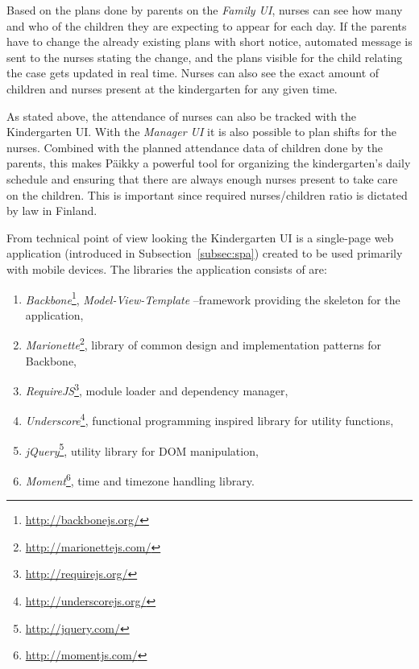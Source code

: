 Based on the plans done by parents on the \textit{Family UI}, nurses can see how many and who of the children they are expecting to appear for each day. If the parents have to change the already existing plans with short notice, automated message is sent to the nurses stating the change, and the plans visible for the child relating the case gets updated in real time. Nurses can also see the exact amount of children and nurses present at the kindergarten for any given time.

As stated above, the attendance of nurses can also be tracked with the Kindergarten UI. With the \textit{Manager UI} it is also possible to plan shifts for the nurses. Combined with the planned attendance data of children done by the parents, this makes Päikky a powerful tool for organizing the kindergarten's daily schedule and ensuring that there are always enough nurses present to take care on the children. This is important since required nurses/children ratio is dictated by law in Finland. %

From technical point of view looking the Kindergarten UI is a single-page web application (introduced in Subsection~\ref{subsec:spa}) created to be used primarily with mobile devices. The libraries the application consists of are: %

\begin{enumerate}
	\item \textit{Backbone}\footnote{\href{http://backbonejs.org/}{http://backbonejs.org/}}, \textit{Model-View-Template} –framework providing the skeleton for the application,
	\item \textit{Marionette}\footnote{\href{http://marionettejs.com/}{http://marionettejs.com/}}, library of common design and implementation patterns for Backbone,
	\item \textit{RequireJS}\footnote{\href{http://requirejs.org/}{http://requirejs.org/}}, module loader and dependency manager,
	\item \textit{Underscore}\footnote{\href{http://underscorejs.org/}{http://underscorejs.org/}}, functional programming inspired library for utility functions,
	\item \textit{jQuery}\footnote{\href{http://jquery.com/}{http://jquery.com/}}, utility library for DOM manipulation,
	\item \textit{Moment}\footnote{\href{http://momentjs.com/}{http://momentjs.com/}}, time and timezone handling library. 
\end{enumerate}



